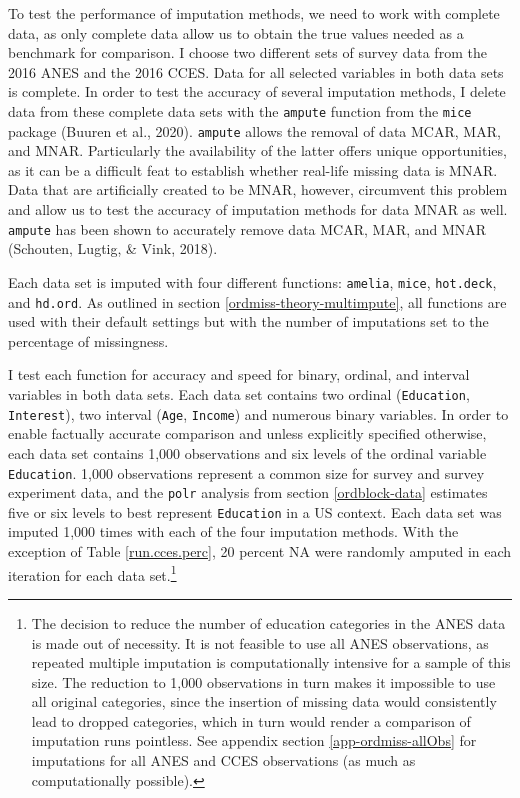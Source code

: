 \documentclass[12pt,econ]{sources/authesis}
\begin{document}
To test the performance of imputation methods, we need to work with complete data, as only complete data allow us to obtain the true values needed as a benchmark for comparison. I choose two different sets of survey data from the 2016 ANES and the 2016 CCES. Data for all selected variables in both data sets is complete. In order to test the accuracy of several imputation methods, I delete data from these complete data sets with the \texttt{ampute} function from the \texttt{mice} package (Buuren et al., 2020). \texttt{ampute} allows the removal of data MCAR, MAR, and MNAR. Particularly the availability of the latter offers unique opportunities, as it can be a difficult feat to establish whether real-life missing data is MNAR. Data that are artificially created to be MNAR, however, circumvent this problem and allow us to test the accuracy of imputation methods for data MNAR as well. \texttt{ampute} has been shown to accurately remove data MCAR, MAR, and MNAR (Schouten, Lugtig, \& Vink, 2018).

Each data set is imputed with four different functions: \texttt{amelia}, \texttt{mice}, \texttt{hot.deck}, and \texttt{hd.ord}. As outlined in section \ref{ordmiss-theory-multimpute}, all functions are used with their default settings but with the number of imputations set to the percentage of missingness.

I test each function for accuracy and speed for binary, ordinal, and interval variables in both data sets. Each data set contains two ordinal (\texttt{Education}, \texttt{Interest}), two interval (\texttt{Age}, \texttt{Income}) and numerous binary variables. In order to enable factually accurate comparison and unless explicitly specified otherwise, each data set contains 1,000 observations and six levels of the ordinal variable \texttt{Education}. 1,000 observations represent a common size for survey and survey experiment data, and the \texttt{polr} analysis from section \ref{ordblock-data} estimates five or six levels to best represent \texttt{Education} in a US context. Each data set was imputed 1,000 times with each of the four imputation methods. With the exception of Table \ref{run.cces.perc}, 20 percent NA were randomly amputed in each iteration for each data set.\footnote{The decision to reduce the number of education categories in the ANES data is made out of necessity. It is not feasible to use all ANES observations, as repeated multiple imputation is computationally intensive for a sample of this size. The reduction to 1,000 observations in turn makes it impossible to use all original categories, since the insertion of missing data would consistently lead to dropped categories, which in turn would render a comparison of imputation runs pointless. See appendix section \ref{app-ordmiss-allObs} for imputations for all ANES and CCES observations (as much as computationally possible).}
\end{document}
